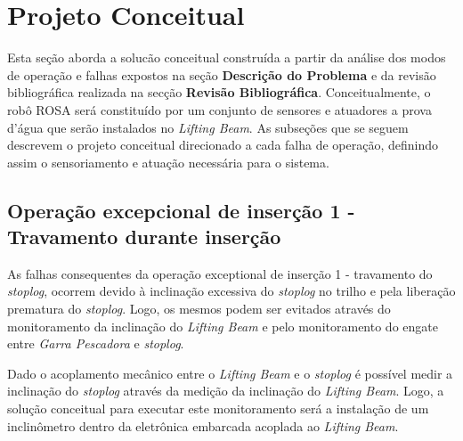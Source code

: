 



\chapter{Projeto Conceitual}
Esta seção aborda a solucão conceitual construída a partir da análise dos modos de operação e falhas expostos na seção {\bf Descrição do Problema} e da revisão bibliográfica realizada na secção {\bf Revisão Bibliográfica}. Conceitualmente, o robô ROSA será constituído por um conjunto de sensores e
atuadores a prova d'água que serão instalados no \emph{Lifting Beam}.
As subseções que se seguem descrevem o projeto conceitual direcionado a cada
falha de operação, definindo assim o sensoriamento e atuação necessária para o sistema. 



\section{Operação excepcional de inserção 1 - Travamento durante inserção}

As falhas consequentes da operação exceptional de inserção 1 - travamento do
\emph{stoplog}, ocorrem devido à inclinação excessiva do \emph{stoplog} no
trilho e pela liberação prematura do \emph{stoplog}. Logo, os mesmos podem ser evitados através do monitoramento da inclinação do \emph{Lifting Beam} e pelo monitoramento do engate entre \emph{Garra Pescadora} e  \emph{stoplog}.

Dado o acoplamento mecânico entre o \emph{Lifting Beam} e o \emph{stoplog} é
possível medir a inclinação do \emph{stoplog} através da medição da inclinação do \emph{Lifting Beam}. Logo, a solução conceitual para executar este monitoramento será a instalação de um inclinômetro dentro da eletrônica embarcada acoplada ao \emph{Lifting Beam}.

